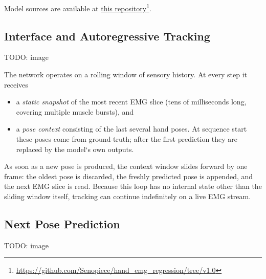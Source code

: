 Model sources are available at \href{https://github.com/Senopiece/hand_emg_regression/tree/v1.0}{this repository}\footnote{\url{https://github.com/Senopiece/hand_emg_regression/tree/v1.0}}.

\subsection{Interface and Autoregressive Tracking}

TODO: image

The network operates on a rolling window of sensory history.
At every step it receives

\begin{itemize}
  \item a \emph{static snapshot} of the most recent EMG slice
        (tens of milliseconds long, covering multiple muscle bursts), and
  \item a \emph{pose context} consisting of the last several hand poses.
        At sequence start these poses come from ground-truth; after the first
        prediction they are replaced by the model`s own outputs.
\end{itemize}

As soon as a new pose is produced, the context window slides forward by one
frame: the oldest pose is discarded, the freshly predicted pose is appended,
and the next EMG slice is read.
Because this loop has no internal state other than the sliding window itself,
tracking can continue indefinitely on a live EMG stream.

\subsection{Next Pose Prediction}

TODO: image

